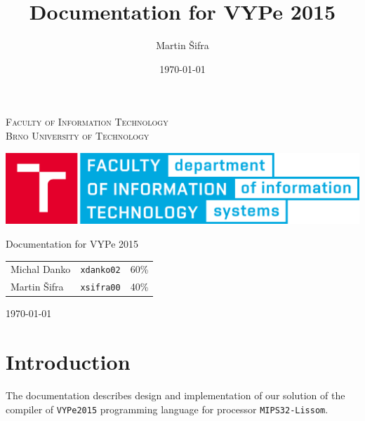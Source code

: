 \documentclass[a4paper, 11pt, titlepage, final]{article}
\title{Documentation for VYPe 2015}
\author{Martin Šifra}
\date{\today}
\begin{document}

\begin{titlepage}
\begin{center}

{\textsc
{\LARGE Faculty of Information Technology \medskip\\
Brno University of Technology}}


{\centering\includegraphics[width=175mm]{img/logo.png}}


{{\Huge Documentation for VYPe 2015}} \bigskip


\end{center}

{\Large
\begin{tabular}{lll}
Michal Danko & \texttt{xdanko02} & 60\% \\
Martin \v{S}ifra & \texttt{xsifra00} & 40\% \\
\end{tabular}
}{\Large \hfill \today}


\end{titlepage}


\pagestyle{plain}
\setcounter{page}{1}

\section{Introduction}

The documentation describes design and implementation of our solution of the compiler of \texttt{VYPe2015} programming language for processor \texttt{MIPS32-Lissom}. 

\end{document}
